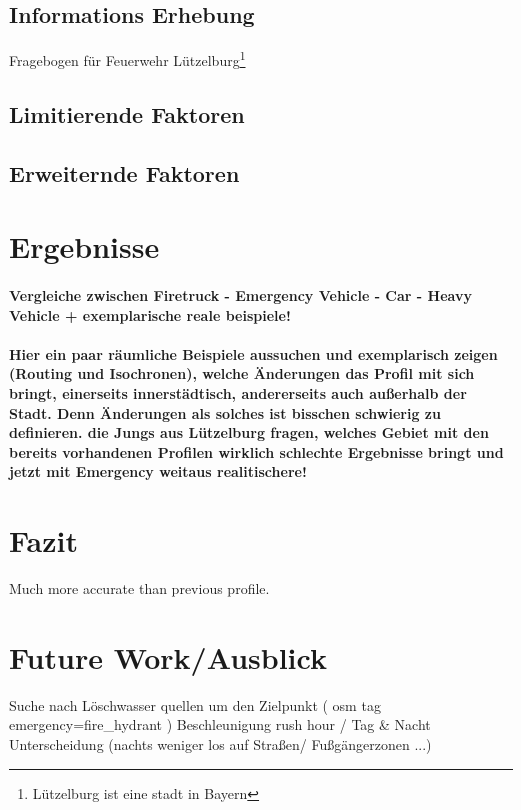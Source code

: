 \documentclass[10pt,a4paper]{article}
\begin{document}
\subsection{Informations Erhebung}
Fragebogen für Feuerwehr Lützelburg\footnote{Lützelburg ist eine stadt in Bayern}

\subsection{Limitierende Faktoren}

\subsection{Erweiternde Faktoren}

\section{Ergebnisse}
\paragraph{
Vergleiche zwischen Firetruck - Emergency Vehicle - Car - Heavy Vehicle
+ exemplarische reale beispiele!
}
\paragraph{
\color{red}
Hier ein paar räumliche Beispiele aussuchen und exemplarisch zeigen (Routing und Isochronen), welche Änderungen das Profil mit sich bringt, einerseits innerstädtisch, andererseits auch außerhalb der Stadt. Denn Änderungen als solches ist bisschen schwierig zu definieren. die Jungs aus Lützelburg fragen, welches Gebiet mit den bereits vorhandenen Profilen wirklich schlechte Ergebnisse bringt und jetzt mit Emergency weitaus realitischere!
}

\section{Fazit}

Much more accurate than previous profile. 

\section{Future Work/Ausblick}

Suche nach Löschwasser quellen um den Zielpunkt ( osm tag emergency=fire_hydrant )
Beschleunigung
rush hour / Tag & Nacht Unterscheidung (nachts weniger los auf Straßen/ Fußgängerzonen ...)
\end{document}
